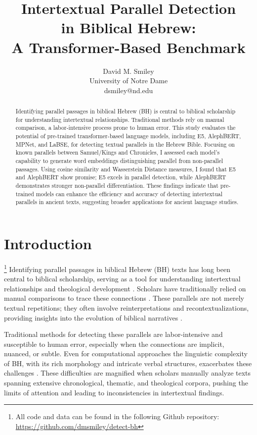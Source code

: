 \documentclass[12pt]{article}
\title{
    \LARGE\bfseries
    Intertextual Parallel Detection\\ in Biblical Hebrew:\\
    A Transformer-Based Benchmark\\[1.2ex]
}
\author{David M. Smiley\\University of Notre Dame\\dsmiley@nd.edu}
\date{}
\begin{document}
\maketitle

\begin{abstract}
Identifying parallel passages in biblical Hebrew (BH) is central to biblical scholarship for understanding intertextual relationships. Traditional methods rely on manual comparison, a labor-intensive process prone to human error. This study evaluates the potential of pre-trained transformer-based language models, including E5, AlephBERT, MPNet, and LaBSE, for detecting textual parallels in the Hebrew Bible. Focusing on known parallels between Samuel/Kings and Chronicles, I assessed each model's capability to generate word embeddings distinguishing parallel from non-parallel passages. Using cosine similarity and Wasserstein Distance measures, I found that E5 and AlephBERT show promise; E5 excels in parallel detection, while AlephBERT demonstrates stronger non-parallel differentiation. These findings indicate that pre-trained models can enhance the efficiency and accuracy of detecting intertextual parallels in ancient texts, suggesting broader applications for ancient language studies.
\end{abstract}

\section{Introduction}
\footnote{All code and data can be found in the following Github repository: \url{https://github.com/dmsmiley/detect-bh}}
Identifying parallel passages in biblical Hebrew (BH) texts has long been central to biblical scholarship, serving as a tool for understanding intertextual relationships and theological development \cite{Fewell}. Scholars have traditionally relied on manual comparisons to trace these connections \cite{Harvey, Miller, Schnittjer}. These parallels are not merely textual repetitions; they often involve reinterpretations and recontextualizations, providing insights into the evolution of biblical narratives \cite{Fishbane, Kalimi}.

Traditional methods for detecting these parallels are labor-intensive and susceptible to human error, especially when the connections are implicit, nuanced, or subtle. Even for computational approaches the linguistic complexity of BH, with its rich morphology and intricate verbal structures, exacerbates these challenges \cite{Singh}. These difficulties are magnified when scholars manually analyze texts spanning extensive chronological, thematic, and theological corpora, pushing the limits of attention and leading to inconsistencies in intertextual findings.
\end{document}

